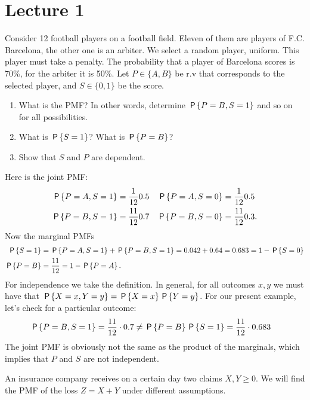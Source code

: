\documentclass[lectures-questions]{subfiles}
\begin{document}
\section{Lecture 1}



\begin{exercise}
Consider 12 football players on a football field.
Eleven of them are players of F.C. Barcelona, the other one is an arbiter.
We select a random player, uniform.
This player must take a penalty.
The probability that a player of Barcelona scores is 70\%, for the arbiter it is 50\%.
Let $P\in \{A, B\}$ be r.v that corresponds to the selected player, and $S\in\{0,1\}$ be the score.
\begin{enumerate}
\item What is the PMF? In other words, determine $\P{P = B, S=1}$ and so on for all possibilities.
\item What is $\P{S=1}$? What is $\P{P=B}$?
\item Show that $S$ and $P$ are dependent.
\end{enumerate}
\begin{solution}
Here is the joint PMF:
\begin{align}
\P{P=A, S=1} &= \frac{1}{12}0.5 & \P{P=A, S=0} &= \frac{1}{12}0.5 \\
\P{P=B, S=1} &= \frac{11}{12}0.7 & \P{P=B, S=0} &= \frac{11}{12}0.3.
\end{align}
Now the marginal PMFs
\begin{align*}
\P{S=1}  &= \P{P=A, S=1} + \P{P=B, S=1} = 0.042 + 0.64 = 0.683 = 1-\P{S=0}\\
\P{P=B}  &= \frac{11}{12} = 1-\P{P=A}.
\end{align*}
For independence we take the definition.
In general, for all outcomes $x,y$ we must have that $\P{X=x, Y=y} = \P{X=x}\P{Y=y}$.
For our present example, let's check for  a particular outcome:
\begin{align*}
\P{P=B, S=1} &= \frac{11}{12}\cdot0.7 \neq \P{P=B}\P{S=1} = \frac{11}{12} \cdot 0.683
\end{align*}
The joint PMF is obviously not the same as the product of the marginals, which implies that $P$ and $S$ are not independent.
\end{solution}
\end{exercise}



An insurance company receives on a certain day two claims $X, Y \geq 0$.
We will find the PMF of the loss $Z=X+Y$ under different assumptions.
\end{document}
